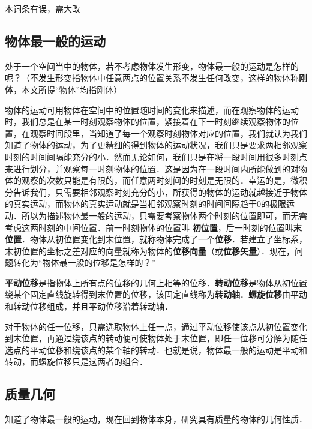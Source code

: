 
\begin{issues}
本词条有误，需大改
\end{issues}
\subsection{物体最一般的运动}
处于一个空间当中的物体，若不考虑物体发生形变，物体最一般的运动是怎样的呢？（不发生形变指物体中任意两点的位置关系不发生任何改变，这样的物体称\textbf{刚体}，本文所提“物体”均指刚体）

物体的运动可用物体在空间中的位置随时间的变化来描述，而在观察物体的运动时，我们总是在某一时刻观察物体的位置，紧接着在下一时刻继续观察物体的位置，在观察时间段里，当知道了每一个观察时刻物体对应的位置，我们就认为我们知道了物体的运动，为了更精细的得到物体的运动状况，我们只是要求两相邻观察时刻的时间间隔能充分的小．然而无论如何，我们只是在将一段时间用很多时刻点来进行划分，并观察每一时刻物体的位置．这是因为在一段时间内所能做到的对物体的观察的次数只能是有限的，而任意两时刻间的时刻是无限的．幸运的是，微积分告诉我们，只需要相邻观察时刻充分的小，所获得的物体的运动就越接近于物体的真实运动，而物体的真实运动就是当相邻观察时刻的时间间隔趋于0的极限运动．所以为描述物体最一般的运动，只需要考察物体两个时刻的位置即可，而无需考虑这两时刻的中间位置．前一时刻物体的位置叫 \textbf{初位置}，后一时刻的位置叫\textbf{末位置}．物体从初位置变化到末位置，就称物体完成了一个\textbf{位移}．若建立了坐标系，末初位置的坐标之差对应的向量就称为物体的\textbf{位移向量}（或\textbf{位移矢量}）．现在，问题转化为“物体最一般的位移是怎样的？”

\textbf{平动位移}是指物体上所有点的位移的几何上相等的位移．\textbf{转动位移}是物体从初位置绕某个固定直线旋转得到末位置的位移，该固定直线称为\textbf{转动轴}．\textbf{螺旋位移}由平动和转动位移组成，并且平动位移沿着转动轴．

对于物体的任一位移，只需选取物体上任一点，通过平动位移使该点从初位置变化到末位置，再通过绕该点的转动便可使物体处于末位置，即任一位移可分解为随任选点的平动位移和绕该点的某个轴的转动．也就是说，物体最一般的运动是平动和转动，而螺旋位移只是这两者的组合．
\subsection{质量几何}
知道了物体最一般的运动，现在回到物体本身，研究具有质量的物体的几何性质．
